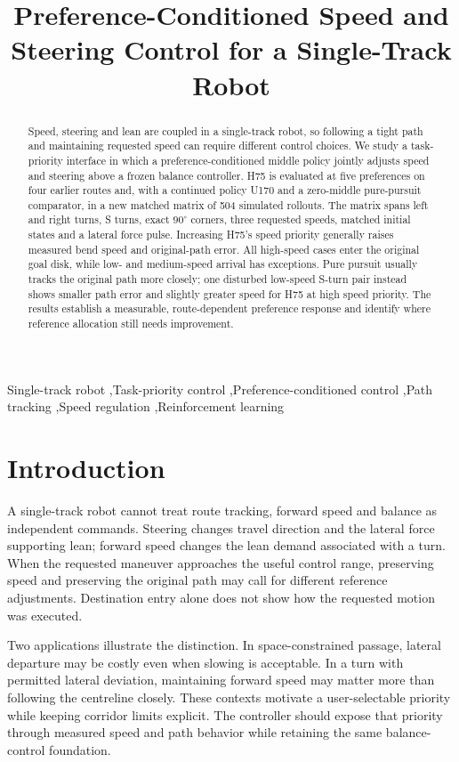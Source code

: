 \documentclass[final,5p,times,twocolumn]{elsarticle}
\begin{document}
\raggedbottom
\begin{frontmatter}
\title{Preference-Conditioned Speed and Steering Control for a Single-Track Robot}
\begin{abstract}
Speed, steering and lean are coupled in a single-track robot, so following a tight path and maintaining requested speed can require different control choices. We study a task-priority interface in which a preference-conditioned middle policy jointly adjusts speed and steering above a frozen balance controller. H75 is evaluated at five preferences on four earlier routes and, with a continued policy U170 and a zero-middle pure-pursuit comparator, in a new matched matrix of 504 simulated rollouts. The matrix spans left and right turns, S turns, exact $90^\circ$ corners, three requested speeds, matched initial states and a lateral force pulse. Increasing H75's speed priority generally raises measured bend speed and original-path error. All high-speed cases enter the original goal disk, while low- and medium-speed arrival has exceptions. Pure pursuit usually tracks the original path more closely; one disturbed low-speed S-turn pair instead shows smaller path error and slightly greater speed for H75 at high speed priority. The results establish a measurable, route-dependent preference response and identify where reference allocation still needs improvement.
\end{abstract}
\begin{keyword}
Single-track robot \sep Task-priority control \sep Preference-conditioned control \sep Path tracking \sep Speed regulation \sep Reinforcement learning
\end{keyword}
\end{frontmatter}

\section{Introduction}
A single-track robot cannot treat route tracking, forward speed and balance as independent commands. Steering changes travel direction and the lateral force supporting lean; forward speed changes the lean demand associated with a turn. When the requested maneuver approaches the useful control range, preserving speed and preserving the original path may call for different reference adjustments. Destination entry alone does not show how the requested motion was executed.

Two applications illustrate the distinction. In space-constrained passage, lateral departure may be costly even when slowing is acceptable. In a turn with permitted lateral deviation, maintaining forward speed may matter more than following the centreline closely. These contexts motivate a user-selectable priority while keeping corridor limits explicit. The controller should expose that priority through measured speed and path behavior while retaining the same balance-control foundation.
\end{document}
